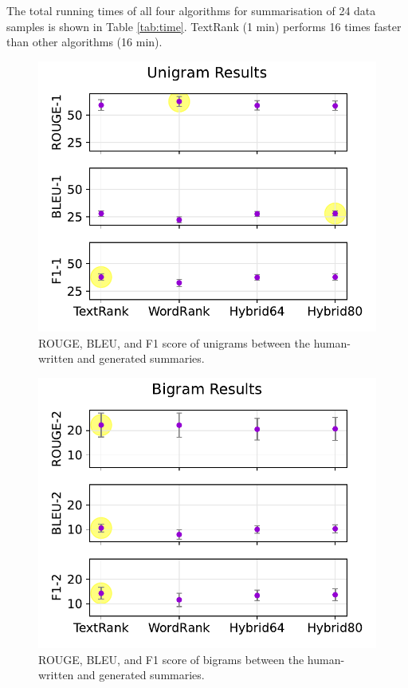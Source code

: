 \documentclass[11pt]{article}
\begin{document}
The total running times of all four algorithms for summarisation of 24 data samples is shown in Table \ref{tab:time}. TextRank (1 min) performs 16 times faster than other algorithms (16 min).

\begin{figure}[!h]
\centering
\includegraphics[scale = 0.5]{../figures/unigrams.pdf}
\caption{ROUGE, BLEU, and F1 score of unigrams between the human-written and generated summaries.\label{fig:uni}}
\end{figure}

\begin{figure}[!h]
\centering
\includegraphics[scale = 0.5]{../figures/bigrams.pdf}
\caption{ROUGE, BLEU, and F1 score of bigrams between the human-written and generated summaries.\label{fig:bi}}
\end{figure}
\end{document}
